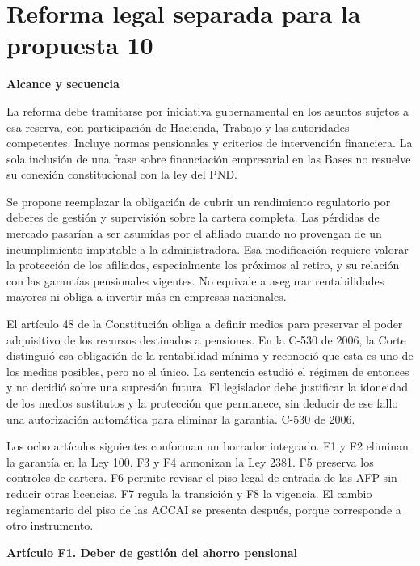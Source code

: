\section*{Reforma legal separada para la propuesta 10}

\textbf{Alcance y secuencia}\par\nobreak

La reforma debe tramitarse por iniciativa gubernamental en los asuntos sujetos a esa reserva, con participación de Hacienda, Trabajo y las autoridades competentes. Incluye normas pensionales y criterios de intervención financiera. La sola inclusión de una frase sobre financiación empresarial en las Bases no resuelve su conexión constitucional con la ley del PND.

Se propone reemplazar la obligación de cubrir un rendimiento regulatorio por deberes de gestión y supervisión sobre la cartera completa. Las pérdidas de mercado pasarían a ser asumidas por el afiliado cuando no provengan de un incumplimiento imputable a la administradora. Esa modificación requiere valorar la protección de los afiliados, especialmente los próximos al retiro, y su relación con las garantías pensionales vigentes. No equivale a asegurar rentabilidades mayores ni obliga a invertir más en empresas nacionales.

El artículo 48 de la Constitución obliga a definir medios para preservar el poder adquisitivo de los recursos destinados a pensiones. En la C-530 de 2006, la Corte distinguió esa obligación de la rentabilidad mínima y reconoció que esta es uno de los medios posibles, pero no el único. La sentencia estudió el régimen de entonces y no decidió sobre una supresión futura. El legislador debe justificar la idoneidad de los medios sustitutos y la protección que permanece, sin deducir de ese fallo una autorización automática para eliminar la garantía. \href{https://www.corteconstitucional.gov.co/relatoria/2006/c-530-06.htm}{C-530 de 2006}.

Los ocho artículos siguientes conforman un borrador integrado. F1 y F2 eliminan la garantía en la Ley 100. F3 y F4 armonizan la Ley 2381. F5 preserva los controles de cartera. F6 permite revisar el piso legal de entrada de las AFP sin reducir otras licencias. F7 regula la transición y F8 la vigencia. El cambio reglamentario del piso de las ACCAI se presenta después, porque corresponde a otro instrumento.

\textbf{Artículo F1. Deber de gestión del ahorro pensional}\par\nobreak

